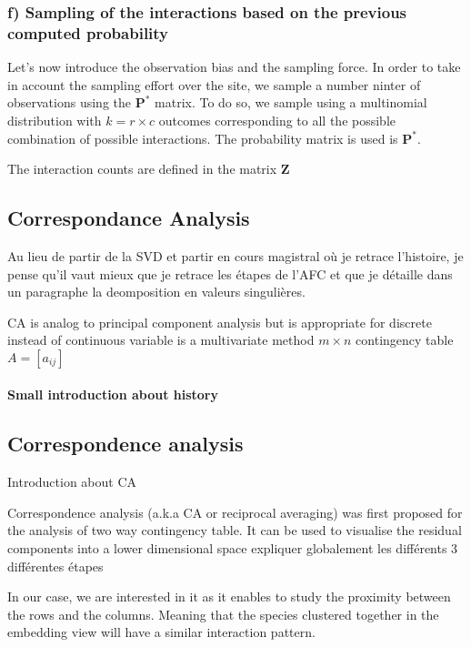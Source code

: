 \documentclass{article}
\begin{document}
\subsubsection{f) Sampling of the interactions based on the previous computed probability}
Let's now introduce the observation bias and the sampling force. In order to take in account the sampling effort over the site, we sample a number ninter of observations using the $\textbf{P}^*$ matrix. To do so, we sample using a multinomial distribution with $k = r \times c$ outcomes corresponding to all the possible combination of possible interactions. The probability matrix is used is $\textbf{P}^*$.

The interaction counts are defined in the matrix $\textbf{Z}$









\subsection{Correspondance Analysis}

Au lieu de partir de la SVD et partir en cours magistral où je retrace l'histoire, je pense qu'il vaut mieux que je retrace les étapes de l'AFC et que je détaille dans un paragraphe la deomposition en valeurs singulières.

CA is analog to principal component analysis but is appropriate for discrete instead of continuous variable
is a multivariate method
$m\times n$ contingency table $A = [a_{ij}]$ 

\paragraph{Small introduction about history}




\subsection{Correspondence analysis}

Introduction about CA

Correspondence analysis (a.k.a CA or reciprocal averaging) was first proposed for the analysis of two way contingency table.  It can be used to visualise the residual components into a lower dimensional space 
expliquer globalement les différents 3 différentes étapes


In our case, we are interested in it as it enables to study the proximity between the rows and the columns. Meaning that the species clustered together in the embedding view will have a similar interaction pattern.
\end{document}
